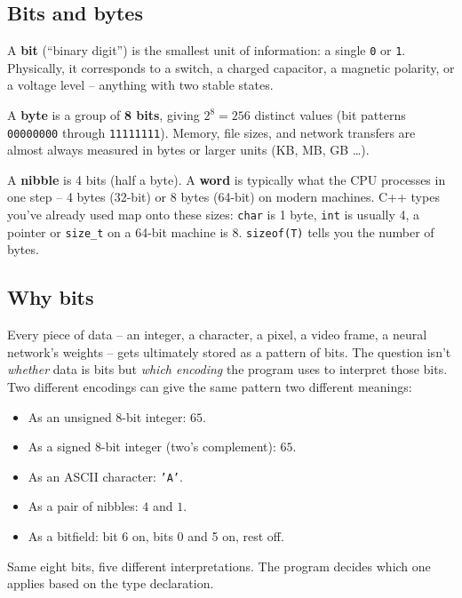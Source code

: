 \documentclass[11pt]{article}
\begin{document}
\subsection{Bits and bytes}

\begin{defnbox}[Bit]
A \textbf{bit} (``binary digit'') is the smallest unit of information:
a single \texttt{0} or \texttt{1}. Physically, it corresponds to a
switch, a charged capacitor, a magnetic polarity, or a voltage level
-- anything with two stable states.
\end{defnbox}

\begin{defnbox}[Byte]
A \textbf{byte} is a group of \textbf{8 bits}, giving $2^8 = 256$
distinct values (bit patterns \texttt{00000000} through
\texttt{11111111}). Memory, file sizes, and network transfers are
almost always measured in bytes or larger units (KB, MB, GB \ldots).
\end{defnbox}

\begin{notebox}
A \textbf{nibble} is 4 bits (half a byte). A \textbf{word} is typically
what the CPU processes in one step -- 4 bytes (32-bit) or 8 bytes
(64-bit) on modern machines. C++ types you've already used map onto
these sizes: \texttt{char} is 1 byte, \texttt{int} is usually 4, a
pointer or \texttt{size\_t} on a 64-bit machine is 8. \texttt{sizeof(T)}
tells you the number of bytes.
\end{notebox}

\subsection{Why bits}

Every piece of data -- an integer, a character, a pixel, a video frame,
a neural network's weights -- gets ultimately stored as a pattern of
bits. The question isn't \emph{whether} data is bits but \emph{which
encoding} the program uses to interpret those bits. Two different
encodings can give the same pattern two different meanings:

\begin{examplebox}
\begin{itemize}[leftmargin=*,noitemsep]
    \item As an unsigned 8-bit integer: $65$.
    \item As a signed 8-bit integer (two's complement): $65$.
    \item As an ASCII character: \texttt{'A'}.
    \item As a pair of nibbles: $4$ and $1$.
    \item As a bitfield: bit 6 on, bits 0 and 5 on, rest off.
\end{itemize}
Same eight bits, five different interpretations. The program decides
which one applies based on the type declaration.
\end{examplebox}
\end{document}
